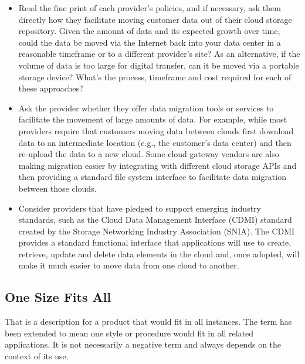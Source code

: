 \begin{itemize}
	\item Read the fine print of each provider’s policies, and if
		necessary, ask them directly how they facilitate moving customer
		data out of their cloud storage repository. Given the amount of
		data and its expected growth over time, could the data be moved
		via the Internet back into your data center in a reasonable
		timeframe or to a different provider’s site? As an alternative,
		if the volume of data is too large for digital transfer, can it
		be moved via a portable storage device? What's the process,
		timeframe and cost required for each of these approaches?
	\item Ask the provider whether they offer data migration tools or
		services to facilitate the movement of large amounts of data.
		For example, while most providers require that customers moving
		data between clouds first download data to an intermediate
		location (e.g., the customer’s data center) and then re-upload
		the data to a new cloud. Some cloud gateway vendors %
		are also
		making migration easier by integrating with different cloud
		storage APIs and then providing a standard file system interface
		to facilitate data migration between those clouds.
	\item Consider providers that have pledged to support emerging
		industry standards, such as the Cloud Data Management Interface
		(CDMI) standard created by the Storage Networking Industry
		Association (SNIA). The CDMI provides a standard functional
		interface that applications will use to create, retrieve, update
		and delete data elements in the cloud and, once adopted, will
		make it much easier to move data from one cloud to another.
\end{itemize}



\subsection{One Size Fits All}

That is a description for a product that would fit in all instances. The
term has been extended to mean one style or procedure would fit in all
related applications. It is not necessarily a negative term and always
depends on the context of its use.

